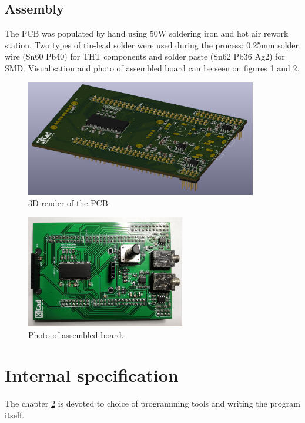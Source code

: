 \documentclass[a4paper,twoside,12pt]{book}
\begin{document}
\section{Assembly}
The PCB was populated by hand using 50W soldering iron and hot air rework station.
Two types of tin-lead solder were used during the process:
0.25mm solder wire (Sn60 Pb40) for THT components and solder paste (Sn62 Pb36 Ag2) for SMD.
Visualisation and photo of assembled board can be seen
on figures \ref{fig:pcb3d} and \ref{fig:photo_assembled}.

\begin{figure}[H]
    \centering
    \includegraphics[width=0.9\textwidth]{images/PCB3D}
    \caption{3D render of the PCB.}
    \label{fig:pcb3d}
\end{figure}

\begin{figure}[H]
    \centering
    \includegraphics[width=0.618\textwidth]{images/photo_assembled}
    \caption{Photo of assembled board.}
    \label{fig:photo_assembled}
\end{figure}



\chapter{Internal specification}\label{ch:internal}
The chapter \ref{ch:internal} is devoted to choice of
programming tools and writing the program itself.
\end{document}
